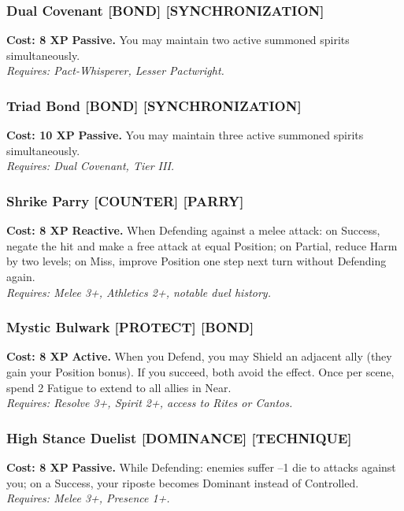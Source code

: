 \subsubsection*{Dual Covenant \textnormal{[BOND] [SYNCHRONIZATION]}}
\label{talent:dual-covenant}
\textbf{Cost: 8 XP} \textbf{Passive.} You may maintain two active summoned spirits simultaneously. \\
\textit{Requires: Pact-Whisperer, Lesser Pactwright.}

\subsubsection*{Triad Bond \textnormal{[BOND] [SYNCHRONIZATION]}}
\label{talent:triad-bond}
\textbf{Cost: 10 XP} \textbf{Passive.} You may maintain three active summoned spirits simultaneously. \\
\textit{Requires: Dual Covenant, Tier III.}

\subsubsection*{Shrike Parry \textnormal{[COUNTER] [PARRY]}}
\label{talent:shrike-parry}
\textbf{Cost: 8 XP} \textbf{Reactive.} When Defending against a melee attack: on Success, negate the hit and make a free attack at equal Position; on Partial, reduce Harm by two levels; on Miss, improve Position one step next turn without Defending again. \\
\textit{Requires: Melee 3+, Athletics 2+, notable duel history.}

\subsubsection*{Mystic Bulwark \textnormal{[PROTECT] [BOND]}}
\label{talent:mystic-bulwark}
\textbf{Cost: 8 XP} \textbf{Active.} When you Defend, you may Shield an adjacent ally (they gain your Position bonus). If you succeed, both avoid the effect. Once per scene, spend 2 Fatigue to extend to all allies in Near. \\
\textit{Requires: Resolve 3+, Spirit 2+, access to Rites or Cantos.}

\subsubsection*{High Stance Duelist \textnormal{[DOMINANCE] [TECHNIQUE]}}
\label{talent:high-stance-duelist}
\textbf{Cost: 8 XP} \textbf{Passive.} While Defending: enemies suffer –1 die to attacks against you; on a Success, your riposte becomes Dominant instead of Controlled. \\
\textit{Requires: Melee 3+, Presence 1+.}

